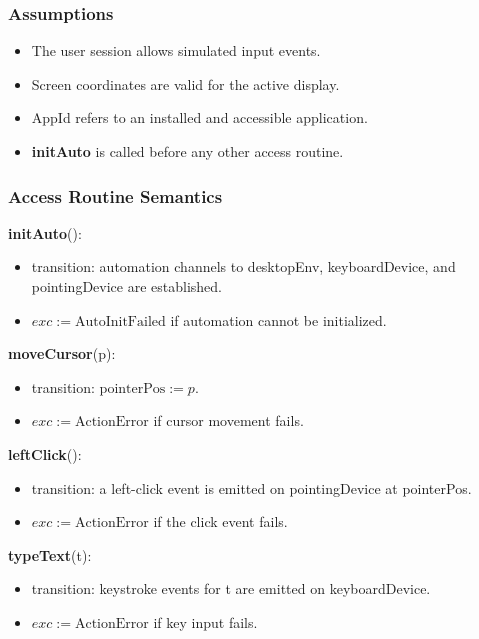 \documentclass[12pt, titlepage]{article}
\begin{document}
\subsubsection{Assumptions}

\begin{itemize}
  \item The user session allows simulated input events.
  \item Screen coordinates are valid for the active display.
  \item AppId refers to an installed and accessible application.
  \item \textbf{initAuto} is called before any other access routine.
\end{itemize}

\subsubsection{Access Routine Semantics}

\noindent
\textbf{initAuto}():
\begin{itemize}
  \item transition: automation channels to desktopEnv, keyboardDevice, and
  pointingDevice are established.
  \item $exc := \text{AutoInitFailed}$ if automation cannot be initialized.
\end{itemize}

\noindent
\textbf{moveCursor}(p):
\begin{itemize}
  \item transition: $\text{pointerPos} := p$.
  \item $exc := \text{ActionError}$ if cursor movement fails.
\end{itemize}

\noindent
\textbf{leftClick}():
\begin{itemize}
  \item transition: a left-click event is emitted on pointingDevice at
  pointerPos.
  \item $exc := \text{ActionError}$ if the click event fails.
\end{itemize}

\noindent
\textbf{typeText}(t):
\begin{itemize}
  \item transition: keystroke events for t are emitted on keyboardDevice.
  \item $exc := \text{ActionError}$ if key input fails.
\end{itemize}
\end{document}
